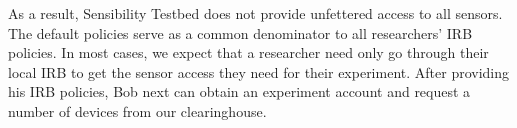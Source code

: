 

As a result, Sensibility Testbed does not
provide unfettered access to all sensors. 
The default policies serve as a common denominator to all 
researchers' IRB policies. In most cases, we expect
that a researcher need only go through their local IRB to get
the sensor access they need for their experiment. After
providing his IRB policies, Bob next can obtain an experiment
account and request a number of devices from our clearinghouse.